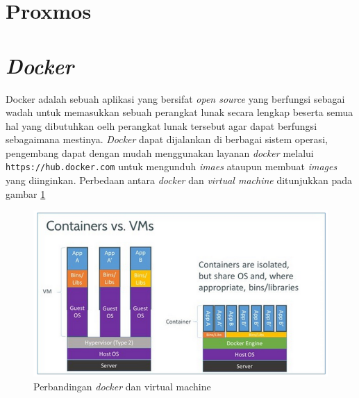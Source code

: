 	\section{Proxmos}
	
	\section{\textit{Docker}}
	Docker adalah sebuah aplikasi yang bersifat \textit{open source} yang berfungsi sebagai wadah untuk memasukkan sebuah perangkat lunak secara lengkap beserta semua hal yang dibutuhkan oelh perangkat lunak tersebut agar dapat berfungsi sebagaimana mestinya. \textit{Docker} dapat dijalankan di berbagai sistem operasi, pengembang dapat dengan mudah menggunakan layanan \textit{docker} melalui \texttt{https://hub.docker.com} untuk mengunduh \textit{imaes} ataupun membuat \textit{images} yang diinginkan. Perbedaan antara \textit{docker} dan \textit{virtual machine} ditunjukkan pada gambar \ref{contohDocker}
	
	\begin{figure}[H] %
	\centering
	\includegraphics[width=\linewidth]{images/bab2/docker-vm-container}
	\caption{Perbandingan \textit{docker} dan virtual machine}
	\label{contohDocker}
	\end{figure}
	
